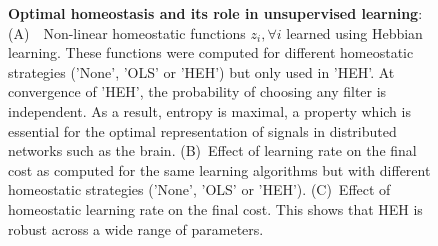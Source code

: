 \documentclass[a4paper, 11pt, draft]{article} %
\begin{document}
\begin{figure}[!ht]%
\caption{
{\bf Optimal homeostasis and its role in unsupervised learning}: 
{\sf (A)}~~Non-linear homeostatic functions $z_i, \forall i$ learned using Hebbian learning. These functions were computed for different homeostatic strategies ('None', 'OLS' or 'HEH') but only used in 'HEH'. At convergence of 'HEH', the probability of choosing any filter is independent. As a result, entropy is maximal, a property which is essential for the optimal representation of signals in distributed networks such as the brain.
{\sf (B)}~Effect of learning rate on the final cost as computed for the same learning algorithms but with different homeostatic strategies ('None', 'OLS' or 'HEH'). 
{\sf (C)}~Effect of homeostatic learning rate on the final cost. This shows that HEH is robust across a wide range of parameters.
\label{fig:HEH}}%
\end{figure}%
% 
% 
\end{document}
